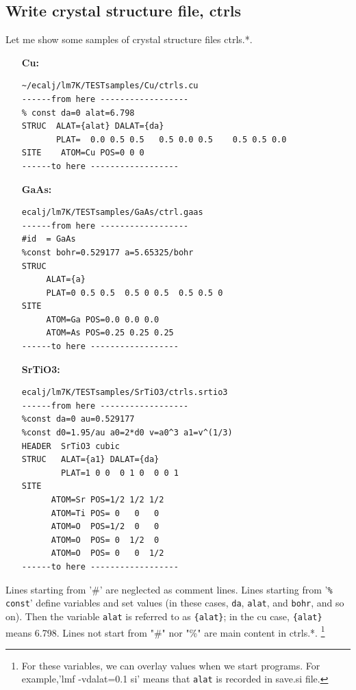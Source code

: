\documentclass[a4paper,10pt,epsf,fleqn]{article}
\newcommand{\io}[1]{{\sf  #1}}
\newcommand{\ctrls}{{\io{ctrls.*}\space }}
\begin{document}
\subsection{Write crystal structure file, ctrls}
\label{ctrls}
Let me show some samples of crystal structure files \ctrls. 
\begin{itemize}
\item[\bf Cu:]
\begin{verbatim}
~/ecalj/lm7K/TESTsamples/Cu/ctrls.cu
------from here ------------------
% const da=0 alat=6.798
STRUC  ALAT={alat} DALAT={da}
       PLAT=  0.0 0.5 0.5   0.5 0.0 0.5    0.5 0.5 0.0
SITE    ATOM=Cu POS=0 0 0
------to here ------------------
\end{verbatim}

\item[\bf GaAs:]
\begin{verbatim}
ecalj/lm7K/TESTsamples/GaAs/ctrl.gaas
------from here ------------------
#id  = GaAs
%const bohr=0.529177 a=5.65325/bohr 
STRUC
     ALAT={a} 
     PLAT=0 0.5 0.5  0.5 0 0.5  0.5 0.5 0 
SITE
     ATOM=Ga POS=0.0 0.0 0.0
     ATOM=As POS=0.25 0.25 0.25
------to here ------------------
\end{verbatim}
\item[\bf SrTiO3:]
\begin{verbatim}
ecalj/lm7K/TESTsamples/SrTiO3/ctrls.srtio3 
------from here ------------------
%const da=0 au=0.529177
%const d0=1.95/au a0=2*d0 v=a0^3 a1=v^(1/3)
HEADER  SrTiO3 cubic 
STRUC   ALAT={a1} DALAT={da} 
        PLAT=1 0 0  0 1 0  0 0 1
SITE
      ATOM=Sr POS=1/2 1/2 1/2
      ATOM=Ti POS= 0   0   0
      ATOM=O  POS=1/2  0   0
      ATOM=O  POS= 0  1/2  0
      ATOM=O  POS= 0   0  1/2
------to here ------------------
\end{verbatim}
\end{itemize}

Lines starting from '\#' are neglected as comment lines.
Lines starting from '\verb+% const+' define variables and set values
(in these cases, \verb+da+, \verb+alat+, and \verb+bohr+, and so on). 
Then the variable \verb+alat+ is referred to as \verb+{alat}+; in the cu case,
\verb+{alat}+ means 6.798.
Lines not start from "\#" nor "\%" are main content in \ctrls.
\footnote{For these variables, we can overlay values when we start
programs. For example,'lmf -vdalat=0.1 si' means that \texttt{alat} is recorded in save.si file.}
\end{document}
